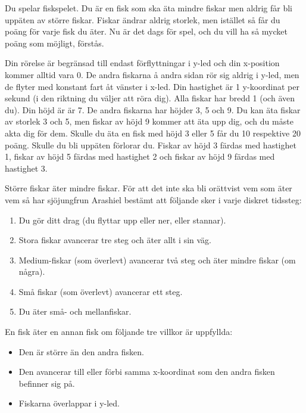 
Du spelar fiskspelet. Du är en fisk som ska äta mindre fiskar men aldrig får
bli uppäten av större fiskar. Fiskar ändrar aldrig storlek, men istället så får
du poäng för varje fisk du äter. Nu är det dags för spel, och du vill ha så mycket
poäng som möjligt, förstås.

Din rörelse är begränsad till endast förflyttningar i y-led och din x-position
kommer alltid vara 0. De andra fiskarna å andra sidan rör sig aldrig i y-led,
men de flyter med konstant fart åt vänster i x-led. Din hastighet är 1
y-koordinat per sekund (i den riktning du väljer att röra dig). Alla fiskar har
bredd 1 (och även du). Din höjd är är 7. De andra fiskarna har höjder 3, 5 och
9. Du kan äta fiskar av storlek 3 och 5, men fiskar av höjd 9 kommer att äta
upp dig, och du måste akta dig för dem. Skulle du äta en fisk med höjd 3 eller
5 får du 10 respektive 20 poäng. Skulle du bli uppäten förlorar du. Fiskar av
höjd 3 färdas med hastighet 1, fiskar av höjd 5 färdas med hastighet 2 och
fiskar av höjd 9 färdas med hastighet 3.

Större fiskar äter mindre fiskar. För att det inte ska bli orättvist vem som
äter vem så har sjöjungfrun Arashiel bestämt att följande sker i varje diskret
tidssteg:

\begin{enumerate}
  \item
     Du gör ditt drag (du flyttar upp eller ner, eller stannar).
  \item
     Stora fiskar avancerar tre steg och äter allt i sin väg.
  \item
     Medium-fiskar (som överlevt) avancerar två steg och äter mindre fiskar (om några).
  \item
     Små fiskar (som överlevt) avancerar ett steg.
  \item
     Du äter små- och mellanfiskar.
\end{enumerate}

En fisk äter en annan fisk om följande tre villkor är uppfyllda:

\begin{itemize}
  \item
    Den är större än den andra fisken.
  \item
    Den avancerar till eller förbi samma x-koordinat som den andra fisken befinner sig på.
  \item
    Fiskarna överlappar i y-led.
\end{itemize}

